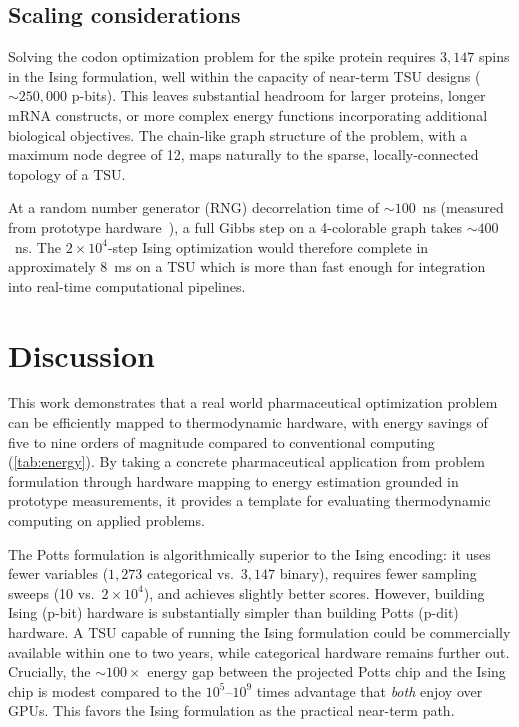 \documentclass[11pt,twocolumn]{article}
\begin{document}
\subsection{Scaling considerations}\label{sec:results_scaling}

Solving the codon optimization problem for the spike protein requires $3{,}147$ spins in the Ising formulation, well within the capacity of near-term TSU designs (${\sim}250{,}000$ p-bits).
This leaves substantial headroom for larger proteins, longer mRNA constructs, or more complex energy functions incorporating additional biological objectives.
The chain-like graph structure of the problem, with a maximum node degree of 12, maps naturally to the sparse, locally-connected topology of a TSU.

At a random number generator (RNG) decorrelation time of ${\sim}100$~ns (measured from prototype hardware~\cite{jelincic2025dtm}), a full Gibbs step on a 4-colorable graph takes ${\sim}400$~ns.
The $2 \times 10^4$-step Ising optimization would therefore complete in approximately $8$~ms on a TSU which is more than fast enough for integration into real-time computational pipelines.

\section{Discussion}\label{sec:discussion}

This work demonstrates that a real world pharmaceutical optimization problem can be efficiently mapped to thermodynamic hardware, with energy savings of five to nine orders of magnitude compared to conventional computing (\cref{tab:energy}).
By taking a concrete pharmaceutical application from problem formulation through hardware mapping to energy estimation grounded in prototype measurements, it provides a template for evaluating thermodynamic computing on applied problems.

The Potts formulation is algorithmically superior to the Ising encoding: it uses fewer variables ($1{,}273$ categorical vs.\ $3{,}147$ binary), requires fewer sampling sweeps (10 vs.\ $2 \times 10^4$), and achieves slightly better scores.
However, building Ising (p-bit) hardware is substantially simpler than building Potts (p-dit) hardware.
A TSU capable of running the Ising formulation could be commercially available within one to two years, while categorical hardware remains further out.
Crucially, the ${\sim}100\times$ energy gap between the projected Potts chip and the Ising chip is modest compared to the $10^5$--$10^9$ times advantage that \emph{both} enjoy over GPUs.
This favors the Ising formulation as the practical near-term path.
\end{document}
